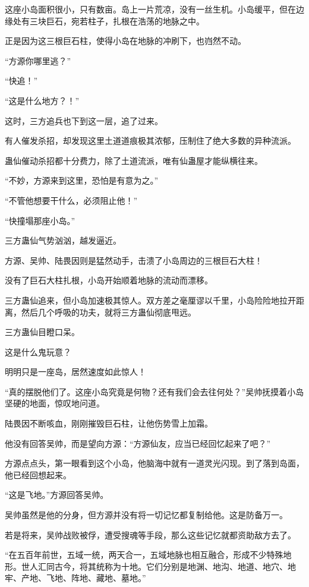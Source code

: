 \begin{this_body}
这座小岛面积很小，只有数亩。岛上一片荒凉，没有一丝生机。小岛缓平，但在边缘处有三块巨石，宛若柱子，扎根在浩荡的地脉之中。

正是因为这三根巨石柱，使得小岛在地脉的冲刷下，也岿然不动。

“方源你哪里逃？”

“快追！”

“这是什么地方？！”

这时，三方追兵也下到这一层，追了过来。

有人催发杀招，却发现这里土道道痕极其浓郁，压制住了绝大多数的异种流派。

蛊仙催动杀招都十分费力，除了土道流派，唯有仙蛊屋才能纵横往来。

“不妙，方源来到这里，恐怕是有意为之。”

“不管他想要干什么，必须阻止他！”

“快撞塌那座小岛。”

三方蛊仙气势汹汹，越发逼近。

方源、吴帅、陆畏因则是猛然动手，击溃了小岛周边的三根巨石大柱！

没有了巨石大柱扎根，小岛开始顺着地脉的流动而漂移。

三方蛊仙追来，但小岛加速极其惊人。双方差之毫厘谬以千里，小岛险险地拉开距离，然后几个呼吸的功夫，就将三方蛊仙彻底甩远。

三方蛊仙目瞪口呆。

这是什么鬼玩意？

明明只是一座岛，居然速度如此惊人！

“真的摆脱他们了。这座小岛究竟是何物？还有我们会去往何处？”吴帅抚摸着小岛坚硬的地面，惊叹地问道。

陆畏因不断咳血，刚刚摧毁巨石柱，让他伤势雪上加霜。

他没有回答吴帅，而是望向方源：“方源仙友，应当已经回忆起来了吧？”

方源点点头，第一眼看到这个小岛，他脑海中就有一道灵光闪现。到了落到岛面，他已经回想起来。

“这是飞地。”方源回答吴帅。

吴帅虽然是他的分身，但方源并没有将一切记忆都复制给他。这是防备万一。

若是将来，吴帅战败被俘，遭受搜魂等手段，那么这些记忆就都资助敌方去了。

“在五百年前世，五域一统，两天合一，五域地脉也相互融合，形成不少特殊地形。世人汇同古今，将其统称为十地。它们分别是地渊、地沟、地道、地穴、地牢、产地、飞地、阵地、藏地、墓地。”


\end{this_body}
